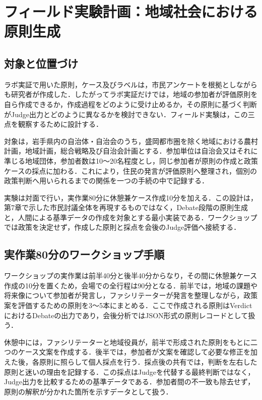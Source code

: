 \section{フィールド実験計画：地域社会における原則生成}
\label{sec:ch8_field_experiment}

\subsection{対象と位置づけ}

ラボ実証で用いた原則，ケース及びラベルは，市民アンケートを根拠としながらも研究者が作成した．したがってラボ実証だけでは，地域の参加者が評価原則を自ら作成できるか，作成過程をどのように受け止めるか，その原則に基づく判断がJudge出力とどのように異なるかを検討できない．フィールド実験は，この三点を観察するために設計する．

対象は，岩手県内の自治体・自治会のうち，盛岡都市圏を除く地域における農村計画，地域計画，総合戦略及び自治会計画とする．参加単位は自治会又はそれに準じる地域団体，参加者数は10〜20名程度とし，同じ参加者が原則の作成と政策ケースの採点に加わる．これにより，住民の発言が評価原則へ整理され，個別の政策判断へ用いられるまでの関係を一つの手続の中で記録する．

実験は対面で行い，実作業80分に休憩兼ケース作成10分を加える．この設計は，第7章で示した市民討議全体を再現するものではなく，Debate段階の原則生成と，人間による基準データの作成を対象とする最小実装である．ワークショップでは政策を決定せず，作成した原則と採点を会後のJudge評価へ接続する．

\subsection{実作業80分のワークショップ手順}

ワークショップの実作業は前半40分と後半40分からなり，その間に休憩兼ケース作成の10分を置くため，会場での全行程は90分となる．前半では，地域の課題や将来像について参加者が発言し，ファシリテーターが発言を整理しながら，政策案を評価するための原則を3〜5本にまとめる．ここで作成される原則はVerdictにおけるDebateの出力であり，会後分析ではJSON形式の原則レコードとして扱う．

休憩中には，ファシリテーターと地域役員が，前半で形成された原則をもとに二つのケース文案を作成する．後半では，参加者が文案を確認して必要な修正を加えた後，各原則に照らして個人採点を行う．採点後の共有では，判断を左右した原則と迷いの理由を記録する．この採点はJudgeを代替する最終判断ではなく，Judge出力を比較するための基準データである．参加者間の不一致も除去せず，原則の解釈が分かれた箇所を示すデータとして扱う．

